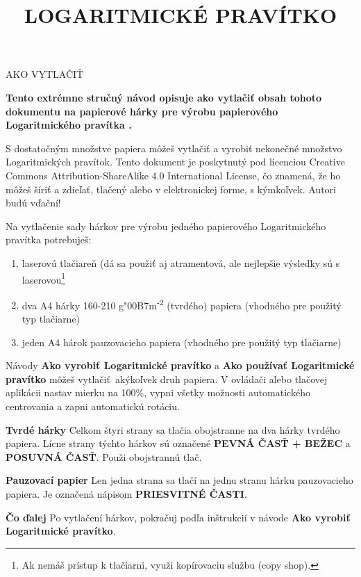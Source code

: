
\newcommand{\makefulltitle}{Ako vytlačiť Logaritmické pravítko }



\title{\fontsize{60}{60}\selectfont LOGARITMICKÉ PRAVÍTKO}
\preauthor{}\postauthor{}\author{}
\predate{}\postdate{}\date{}


  \begin{center}
    \headingfont\fontsize{20}{20}\selectfont AKO VYTLAČIŤ
  \end{center}

  {\let\newpage\relax\maketitle}%
  \nosection{}
  \large\textbf{\makeperex Tento extrémne stručný návod opisuje ako vytlačiť obsah tohoto dokumentu na papierové hárky pre výrobu papierového Logaritmického pravítka \modelname.}

  \begin{multicols*}{3}
  \normalsize{

  S dostatočným množstve papiera môžeš vytlačiť a vyrobiť nekonečné množstvo Logaritmických pravítok. Tento dokument je poskytnutý pod licenciou Creative Commons Attribution-ShareAlike 4.0 International License, čo znamená, že ho môžeš šíriť a zdieľať, tlačený alebo v elektronickej forme, s kýmkoľvek. Autori budú vďační!

  Na vytlačenie sady hárkov pre výrobu jedného papierového Logaritmického pravítka potrebuješ:
    \begin{enumerate}
      \setlength{\parskip}{0pt}
      \setlength{\parsep}{0pt}
      \item laserovú tlačiareň (dá sa použiť aj atramentová, ale nejlepšie výsledky sú s laserovou\footnote{Ak nemáš prístup k tlačiarni, využi kopírovaciu službu (copy shop).}
      \item dva A4 hárky 160-210 g{\char"00B7}m\textsuperscript{-2} (tvrdého) papiera (vhodného pre použitý typ tlačiarne)
      \item jeden A4 hárok pauzovacieho papiera (vhodného pre použitý typ tlačiarne)
    \end{enumerate}

  Návody \textbf{Ako vyrobiť Logaritmické pravítko} a \textbf{Ako používať Logaritmické pravítko} môžeš vytlačiť akýkoľvek druh papiera. V ovládači alebo tlačovej aplikácii nastav mierku na 100\%, vypni všetky možnosti automatického centrovania a zapni automatickú rotáciu.

  \textbf{Tvrdé hárky}
Celkom štyri strany sa tlačia obojstranne na dva hárky tvrdého papiera. Lícne strany týchto hárkov sú označené \textbf{PEVNÁ ČASŤ + BEŽEC} a \textbf{POSUVNÁ ČASŤ}. Použi obojstrannú tlač.

  \textbf{Pauzovací papier}
Len jedna strana sa tlačí na jednu stranu hárku pauzovacieho papiera. Je označená nápisom \textbf{PRIESVITNÉ ČASTI}.

  \textbf{Čo ďalej}
Po vytlačení hárkov, pokračuj podľa inštrukcií v návode \textbf{Ako vyrobiť Logaritmické pravítko}.

  }
  \end{multicols*}
  

